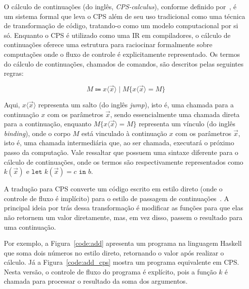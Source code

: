 O cálculo de continuações (do inglês, \textit{CPS-calculus}), conforme definido por~, é um sistema formal que leva o CPS além de seu uso tradicional como uma técnica de transformação de código, tratando-o como um modelo computacional por si só.
Enquanto o CPS é utilizado como uma IR em compiladores, o cálculo de continuações oferece uma estrutura para raciocinar formalmente sobre computações onde o fluxo de controle é explicitamente representado.
Os termos do cálculo de continuações, chamados de comandos, são descritos pelas seguintes regras:

\begin{equation}
  M \Coloneqq x\langle \vec{x} \rangle \mid M\{x\langle \vec{x} \rangle = M\}
\end{equation}

Aqui, $x\langle \vec{x} \rangle$ representa um salto (do inglês \textit{jump}), isto é, uma chamada para a continuação $x$ com os parâmetros $\vec{x}$, sendo essencialmente uma chamada direta para a continuação, enquanto $M\{x\langle \vec{x} \rangle = M\}$ representa um vínculo (do inglês \textit{binding}), onde o corpo $M$ está vinculado à continuação $x$ com os parâmetros $\vec{x}$, isto é, uma chamada intermediária que, ao ser chamada, executará o próximo passo da computação.
Vale ressaltar que  possuem uma sintaxe diferente para o cálculo de continuações, onde os termos são respectivamente representados como $k(\vec{x})$ e $\texttt{let }k(\vec{x}) = c \texttt{ in } b$.

A tradução para CPS converte um código escrito em estilo direto (onde o controle de fluxo é implícito) para o estilo de passagem de continuações~\cite{flanagan1993essence}.
A principal ideia por trás dessa transformação é modificar as funções para que elas não retornem um valor diretamente, mas, em vez disso, passem o resultado para uma continuação.





Por exemplo, a Figura~\ref{code:add} apresenta um programa na linguagem Haskell que soma dois números no estilo direto, retornando o valor após realizar o cálculo.
Já a Figura~\ref{code:add_cps} mostra um programa equivalente em CPS\@.
Nesta versão, o controle de fluxo do programa é explícito, pois a função $k$ é chamada para processar o resultado da soma dos argumentos.

